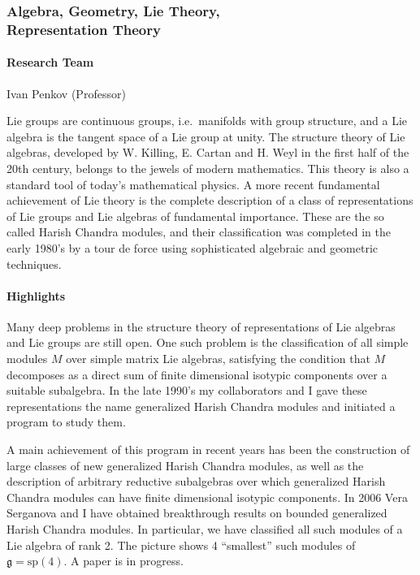 \subsubsection[Algebra, Geometry, Lie Theory, Representation Theory]{Algebra, Geometry, Lie Theory, \\ Representation Theory}
\paragraph{Research Team}
Ivan Penkov (Professor)

\medskip

Lie groups are continuous groups, i.e.\ manifolds with group structure,
and a Lie algebra is the tangent space of a Lie group at unity. The
structure theory of Lie algebras, developed by W. Killing, E. Cartan
and H. Weyl in the first half of the 20th century, belongs to the
jewels of modern mathematics. This theory is also a standard tool of
today's mathematical physics. A more recent fundamental achievement of
Lie theory is the complete description of a class of representations
of Lie groups and Lie algebras of fundamental importance. These are
the so called Harish Chandra modules, and their classification was
completed in the early 1980's by a tour de force using sophisticated
algebraic and geometric techniques.

\paragraph{Highlights}

Many deep problems in the structure theory of representations of Lie
algebras and Lie groups are still open. One such problem is the
classification of all simple modules $M$ over simple matrix Lie
algebras, satisfying the condition that $M$ decomposes as a direct sum
of finite dimensional isotypic components over a suitable
subalgebra. In the late 1990's my collaborators and I gave these
representations the name generalized Harish Chandra modules and
initiated a program to study them.

A main achievement of this program in recent years has been the
construction of large classes of new generalized Harish Chandra
modules, as well as the description of arbitrary reductive subalgebras
over which generalized Harish Chandra modules can have finite
dimensional isotypic components. In 2006 Vera Serganova and I have
obtained breakthrough results on bounded generalized Harish Chandra
modules. In particular, we have classified all such modules of a Lie
algebra of rank 2. The picture shows 4 ``smallest'' such modules of
$\mathfrak g=\mathrm{sp}(4)$. A paper is in progress.

